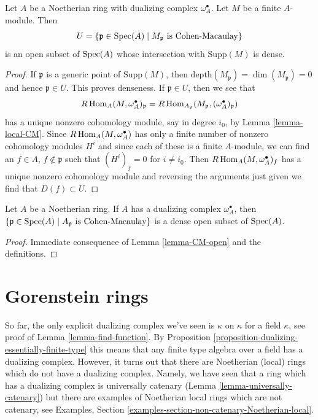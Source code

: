 \begin{lemma}
\label{lemma-CM-open}
Let $A$ be a Noetherian ring with dualizing complex $\omega_A^\bullet$.
Let $M$ be a finite $A$-module. Then
$$
U = \{\mathfrak p \in \mathop{\mathrm{Spec}}(A) \mid M_\mathfrak p\text{ is Cohen-Macaulay}\}
$$
is an open subset of $\mathop{\mathrm{Spec}}(A)$ whose intersection with
$\text{Supp}(M)$ is dense.
\end{lemma}

\begin{proof}
If $\mathfrak p$ is a generic point of $\text{Supp}(M)$, then
$\text{depth}(M_\mathfrak p) = \dim(M_\mathfrak p) = 0$
and hence $\mathfrak p \in U$. This proves denseness.
If $\mathfrak p \in U$, then we see that
$$
R\mathop{\mathrm{Hom}}\nolimits_A(M, \omega_A^\bullet)_\mathfrak p =
R\mathop{\mathrm{Hom}}\nolimits_{A_\mathfrak p}(M_\mathfrak p, (\omega_A^\bullet)_\mathfrak p)
$$
has a unique nonzero cohomology module, say in degree $i_0$, by
Lemma \ref{lemma-local-CM}.
Since $R\mathop{\mathrm{Hom}}\nolimits_A(M, \omega_A^\bullet)$
has only a finite number of nonzero cohomology modules $H^i$
and since each of these is a finite $A$-module, we can
find an $f \in A$, $f \not \in \mathfrak p$ such that
$(H^i)_f = 0$ for $i \not = i_0$. Then
$R\mathop{\mathrm{Hom}}\nolimits_A(M, \omega_A^\bullet)_f$ has a unique nonzero cohomology
module and reversing the arguments just given we find
that $D(f) \subset U$.
\end{proof}

\begin{lemma}
\label{lemma-CM}
Let $A$ be a Noetherian ring. If $A$ has a dualizing complex
$\omega_A^\bullet$, then
$\{\mathfrak p \in \mathop{\mathrm{Spec}}(A) \mid A_\mathfrak p\text{ is Cohen-Macaulay}\}$
is a dense open subset of $\mathop{\mathrm{Spec}}(A)$.
\end{lemma}

\begin{proof}
Immediate consequence of Lemma \ref{lemma-CM-open} and the definitions.
\end{proof}






\section{Gorenstein rings}
\label{section-gorenstein}

\noindent
So far, the only explicit dualizing complex we've seen is $\kappa$ on $\kappa$
for a field $\kappa$, see proof of Lemma \ref{lemma-find-function}.
By Proposition \ref{proposition-dualizing-essentially-finite-type}
this means that any finite type algebra over a field has a dualizing
complex. However, it turns out that there are Noetherian (local) rings
which do not have a dualizing complex. Namely, we have seen that
a ring which has a dualizing complex is universally catenary
(Lemma \ref{lemma-universally-catenary})
but there are examples of
Noetherian local rings which are not catenary, see
Examples, Section \ref{examples-section-non-catenary-Noetherian-local}.

